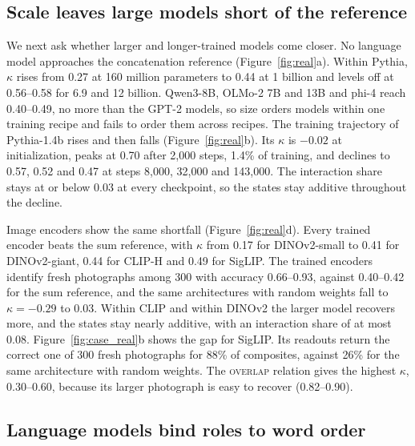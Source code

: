 \documentclass[10pt]{article}
\theoremstyle{plain}
\theoremstyle{remark}
\begin{document}
\subsection{Scale leaves large models short of the reference}
\label{sec:llm}

We next ask whether larger and longer-trained models come closer. No language model approaches the concatenation reference (Figure~\ref{fig:real}a). Within Pythia, $\kappa$ rises from 0.27 at 160 million parameters to 0.44 at 1 billion and levels off at 0.56--0.58 for 6.9 and 12 billion. Qwen3-8B, OLMo-2 7B and 13B and phi-4 reach 0.40--0.49, no more than the GPT-2 models, so size orders models within one training recipe and fails to order them across recipes. The training trajectory of Pythia-1.4b rises and then falls (Figure~\ref{fig:real}b). Its $\kappa$ is $-0.02$ at initialization, peaks at 0.70 after 2{,}000 steps, 1.4\% of training, and declines to 0.57, 0.52 and 0.47 at steps 8{,}000, 32{,}000 and 143{,}000. The interaction share stays at or below 0.03 at every checkpoint, so the states stay additive throughout the decline.

\label{sec:vision}Image encoders show the same shortfall (Figure~\ref{fig:real}d). Every trained encoder beats the sum reference, with $\kappa$ from 0.17 for DINOv2-small to 0.41 for DINOv2-giant, 0.44 for CLIP-H and 0.49 for SigLIP. The trained encoders identify fresh photographs among 300 with accuracy 0.66--0.93, against 0.40--0.42 for the sum reference, and the same architectures with random weights fall to $\kappa = -0.29$ to $0.03$. Within CLIP and within DINOv2 the larger model recovers more, and the states stay nearly additive, with an interaction share of at most 0.08. Figure~\ref{fig:case_real}b shows the gap for SigLIP. Its readouts return the correct one of 300 fresh photographs for 88\% of composites, against 26\% for the same architecture with random weights. The \textsc{overlap} relation gives the highest $\kappa$, 0.30--0.60, because its larger photograph is easy to recover (0.82--0.90).

\subsection{Language models bind roles to word order}
\label{sec:roles}
\end{document}
